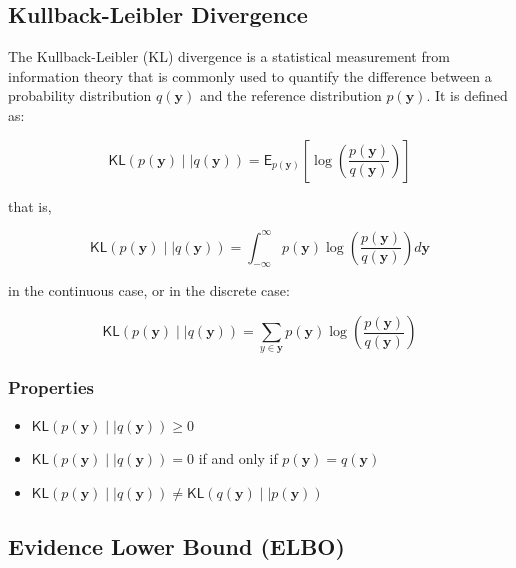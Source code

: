 \subsection{Kullback-Leibler Divergence}

The Kullback-Leibler (KL) divergence \cite{KL} is a statistical measurement from information theory that is commonly used to quantify the difference between a probability distribution $q(\bm{y})$ and the reference distribution $p(\bm{y})$. It is defined as:

\begin{equation}
\label{KL_div}
\mathsf{KL}\left(p(\bm{y})\mid\mid q(\bm{y})\right)=\mathsf{E}_{p(\bm{y})}\left[\log\left(\frac{p(\bm{y})}{q(\bm{y})}\right)\right]
\end{equation}

that is, 

\begin{equation}
\label{KL_div1}
\mathsf{KL}\left(p(\bm{y})\mid\mid q(\bm{y})\right)=\int_{-\infty}^{\infty}p(\bm{y})\log\left(\frac{p(\bm{y})}{q(\bm{y})}\right)d\bm{y}
\end{equation}

in the continuous case, or in the discrete case:

\begin{equation}
\label{KL_div2}
\mathsf{KL}\left(p(\bm{y})\mid\mid q(\bm{y})\right)=\sum_{y \in \bm{y}} p(\bm{y}) \log\left(\frac{p(\bm{y})}{q(\bm{y})}\right)
\end{equation}

\subsubsection{Properties}

\begin{itemize}
    \item $\mathsf{KL}\left(p(\bm{y})\mid\mid q(\bm{y})\right)\geq0$
    \item $\mathsf{KL}\left(p(\bm{y})\mid\mid q(\bm{y})\right)=0$ if and only if $p(\bm{y})=q(\bm{y})$
    \item $\mathsf{KL}\left(p(\bm{y})\mid\mid q(\bm{y})\right)\neq \mathsf{KL}\left(q(\bm{y})\mid\mid p(\bm{y})\right)$
\end{itemize}

\subsection{Evidence Lower Bound (ELBO)}

